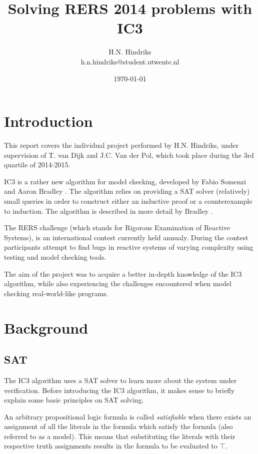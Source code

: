 \documentclass[a4paper]{article}
\begin{document}
\title{Solving RERS 2014 problems with IC3}
\author{H.N. Hindriks\\h.n.hindriks@student.utwente.nl}
\date{\today}
\maketitle

\section{Introduction}
This report covers the individual project performed by H.N. Hindriks, under supervision of T. van Dijk and J.C. Van der Pol, which took place during the 3rd quartile of 2014-2015.

IC3 is a rather new algorithm for model checking, developed by Fabio Somenzi and Aaron Bradley \cite{Bradley2007}. The algorithm relies on providing a SAT solver (relatively) small queries in order to construct either an inductive proof or a counterexample to induction. The algorithm is described in more detail by Bradley \cite{Bradley2011}.

The RERS challenge (which stands for Rigorous Examination of Reactive Systems), is an international contest currently held annualy. During the contest participants attempt to find bugs in reactive systems of varying complexity using testing and model checking tools.

The aim of the project was to acquire a better in-depth knowledge of the IC3 algorithm, while also experiencing the challenges encountered when model checking real-world-like programs.

\section{Background}
\subsection{SAT}
The IC3 algorithm uses a SAT solver to learn more about the system under verification. Before introducing the IC3 algorithm, it makes sense to briefly explain some basic principles on SAT solving.

An arbitrary propositional logic formula is called \emph{satisfiable} when there exists an assignment of all the literals in the formula which satisfy the formula (also referred to as a model). This means that substituting the literals with their respective truth assignments results in the formula to be evaluated to $\top$.
\end{document}
